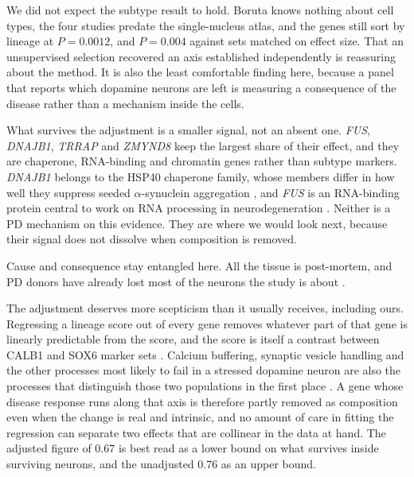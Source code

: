 \documentclass[11pt,a4paper]{article}
\begin{document}
We did not expect the subtype result to hold. Boruta \citep{kursa2010} knows nothing about cell types, the
four studies predate the single-nucleus atlas, and the genes still sort by lineage at $P=0.0012$, and
$P=0.004$ against sets matched on effect size. That an unsupervised selection recovered an axis established
independently \citep{kamath2022,poulin2020} is reassuring about the method. It is also the least comfortable
finding here, because a panel that reports which dopamine neurons are left is measuring a consequence of the
disease rather than a mechanism inside the cells.

What survives the adjustment is a smaller signal, not an absent one. \textit{FUS}, \textit{DNAJB1},
\textit{TRRAP} and \textit{ZMYND8} keep the largest share of their effect, and they are chaperone, RNA-binding
and chromatin genes rather than subtype markers. \textit{DNAJB1} belongs to the HSP40 chaperone family, whose members differ in how well they
suppress seeded $\alpha$-synuclein aggregation \citep{deshayes2019}, and \textit{FUS} is an RNA-binding
protein central to work on RNA processing in neurodegeneration \citep{lagiertourenne2010}. Neither is a PD mechanism on this evidence. They are where we would look next, because their signal does not
dissolve when composition is removed.

Cause and consequence stay entangled here. All the tissue is post-mortem, and PD donors have already lost
most of the neurons the study is about \citep{kordower2013}.

The adjustment deserves more scepticism than it usually receives, including ours. Regressing a lineage score
out of every gene removes whatever part of that gene is linearly predictable from the score, and the score is
itself a contrast between CALB1 and SOX6 marker sets \citep{kamath2022}. Calcium buffering, synaptic vesicle
handling and the other processes most likely to fail in a stressed dopamine neuron are also the processes
that distinguish those two populations in the first place \citep{surmeier2017,poulin2020}. A gene whose
disease response runs along that axis is therefore partly removed as composition even when the change is
real and intrinsic, and no amount of care in fitting the regression can separate two effects that are
collinear in the data at hand. The adjusted figure of 0.67 is best read as a lower bound on what survives
inside surviving neurons, and the unadjusted 0.76 as an upper bound.
\end{document}
